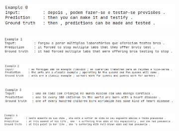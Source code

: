 \documentclass[12pt, a4paper]{book}
\begin{document}
\begin{figure}
    \begin{subfigure}{\linewidth}
        \begin{flushright}
        \includegraphics[width=\linewidth]{images/examples/1.png}
        \end{flushright}
    \end{subfigure}
    \break
    \begin{subfigure}{\linewidth}
        \begin{flushright}
        \includegraphics[width=\linewidth]{images/examples/2.png}
        \end{flushright}
    \end{subfigure}
    \break
    \begin{subfigure}{\linewidth}
        \begin{flushright}
        \includegraphics[width=\linewidth]{images/examples/3.png}
        \end{flushright}
    \end{subfigure}
    \break
    \begin{subfigure}{\linewidth}
        \begin{flushright}
        \includegraphics[width=\linewidth]{images/examples/4.png}
        \end{flushright}
    \end{subfigure}
    \break
    \begin{subfigure}{\linewidth}
        \begin{flushright}
        \includegraphics[width=\linewidth]{images/examples/5.png}

\end{flushright}
\end{subfigure}
\end{figure}
\end{document}
